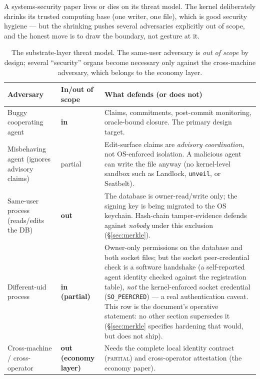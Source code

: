 \documentclass[11pt,a4paper]{article}
\newcommand{\BuiltWeak}{{\textcolor{hhink}{\textsc{partial}}}}
\theoremstyle{definition}
\theoremstyle{remark}
\begin{document}
A systems-security paper lives or dies on its threat model. The kernel deliberately
shrinks its trusted computing base (one writer, one file), which is good security
hygiene --- but the shrinking pushes several adversaries explicitly out of scope,
and the honest move is to draw the boundary, not gesture at it.

\renewcommand{\arraystretch}{1.25}
\begin{table}[H]
\centering
\caption{The substrate-layer threat model. The same-user adversary is \emph{out of
scope} by design; several ``security'' organs become necessary only against the
cross-machine adversary, which belongs to the economy layer.}
\label{tab:threat-model}
\small
\begin{tabularx}{\textwidth}{@{}>{\raggedright\arraybackslash}p{} >{\raggedright\arraybackslash}p{} >{\raggedright\arraybackslash}X@{}}
\toprule
\textbf{Adversary} & \textbf{In/out of scope} & \textbf{What defends (or does not)} \\
\midrule
Buggy cooperating agent & \textbf{in} & Claims, commitments, post-commit monitoring, oracle-bound closure. The primary design target. \\
Misbehaving agent (ignores advisory claims) & partial & Edit-surface claims are \emph{advisory coordination}, not OS-enforced isolation. A malicious agent can write the file anyway (no kernel-level sandbox such as Landlock, \texttt{unveil}, or Seatbelt). \\
Same-user process (reads/edits the DB) & \textbf{out} & The database is owner-read/write only; the signing key is being migrated to the OS keychain. Hash-chain tamper-evidence defends against \emph{nobody} under this exclusion (\S\ref{sec:merkle}). \\
Different-uid process & \textbf{in (partial)} & Owner-only permissions on the database and both socket files; but the socket peer-credential check is a software handshake (a self-reported agent identity checked against the registration table), \emph{not} the kernel-enforced socket credential (\texttt{SO\_PEERCRED}) --- a real authentication caveat. This row is the document's operative statement: no other section supersedes it (\S\ref{sec:merkle} specifies hardening that would, but does not ship). \\
Cross-machine / cross-operator & \textbf{out (economy layer)} & Needs the complete local identity contract (\BuiltWeak) and cross-operator attestation (the economy paper). \\
\bottomrule
\end{tabularx}
\end{table}
\end{document}
